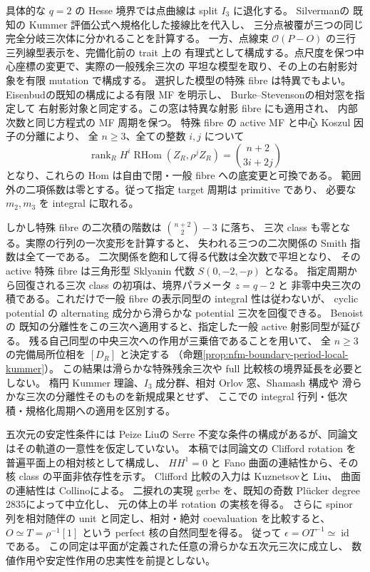 \documentclass[11pt,a4paper]{ltjsarticle}
\numberwithin{equation}{section}
\begin{document}
具体的な $q=2$ の Hesse 境界では点曲線は split $I_3$ に退化する。
Silverman\cite[Chapter~XI, Proposition~9.2]{NFMSilvermanArithmetic}の
既知の Kummer 評価公式へ規格化した接線比を代入し、
三分点被覆が三つの同じ完全分岐三次体に分かれることを計算する。
一方、点線束 $\mathcal O(P-O)$ の三行三列線型表示を、完備化前の trait 上の
有理式として構成する。点尺度を保つ中心座標の変更で、実際の一般残余三次の
平坦な模型を取り、その上の右射影対象を有限 mutation で構成する。
選択した模型の特殊 fibre は特異でもよい。
Eisenbud\cite[Theorem~7.2]{NFMEisenbudCI}の既知の構成による有限 MF を明示し、
Burke--Stevenson\cite[Theorem~6.4(1)]{NFMBurkeStevenson}の相対窓を指定して
右射影対象と同定する。この窓は特異な射影 fibre にも適用され、
内部次数と同じ方程式の MF 周期を保つ。
特殊 fibre の active MF と中心 Koszul 因子の分離により、
全 $n\ge3$、全ての整数 $i,j$ について
\[
 \operatorname{rank}_R H^i\operatorname{RHom}(Z_R,\rho^jZ_R)
 =\binom{n+2}{3i+2j}
\]
となり、これらの Hom は自由で閉・一般 fibre への底変更と可換である。
範囲外の二項係数は零とする。従って指定 target 周期は primitive であり、
必要な $m_2,m_3$ を integral に取れる。

しかし特殊 fibre の二次積の階数は $\binom{n+2}{2}-3$ に落ち、
三次 class も零となる。実際の行列の一次変形を計算すると、
失われる三つの二次関係の Smith 指数は全て一である。
二次関係を飽和して得る代数は全次数で平坦となり、
その active 特殊 fibre は三角形型 Sklyanin 代数 $S(0,-2,-p)$ となる。
指定周期から回復される三次 class の初項は、境界パラメータ $z=q-2$ と
非零中央三次の積である。これだけで一般 fibre の表示同型の integral 性は従わないが、
cyclic potential の alternating 成分から滑らかな potential 三次を回復できる。
Benoist\cite[Theorems~1.6(ii), 1.7, Lemma~2.2(iii)]{NFMBenoistSeparation}の
既知の分離性をこの三次へ適用すると、指定した一般 active 射影同型が延びる。
残る自己同型の中央三次への作用が三乗倍であることを用いて、
全 $n\ge3$ の完備局所位相を $[D_R]$ と決定する
（命題\ref{prop:nfm-boundary-period-local-kummer}）。
この結果は滑らかな特殊残余三次や full 比較核の境界延長を必要としない。
楕円 Kummer 理論、$I_3$ 成分群、相対 Orlov 窓、Shamash 構成や
滑らかな三次の分離性そのものを新規成果とせず、
ここでの integral 行列・低次積・規格化周期への適用を区別する。

五次元の安定性条件には Peize Liu\cite[Theorem~1.1, Remark~5.6]{NFMPeizeLiuFivefold}の
Serre 不変な条件の構成があるが、同論文はその軌道の一意性を仮定していない。
本稿では同論文の Clifford rotation を普遍平面上の相対核として構成し、
$HH^1=0$ と Fano 曲面の連結性から、その核 class の平面非依存性を示す。
Clifford 比較の入力は Kuznetsov\cite[Theorem~4.2]{NFMKuznetsovQuadric}と
Liu\cite[Theorem~2.8, Corollary~3.10]{NFMPeizeLiuFivefold}、
曲面の連結性は Collino\cite[Propositions~1.8, 1.10]{NFMCollinoFivefold}による。
二捩れの実現 gerbe を、既知の奇数 Pl\"ucker degree
$2835$\cite[Example~4.4]{NFMCilibertoZaidenbergFano}によって中立化し、
元の体上の半 rotation の実核を得る。
さらに spinor 列を相対随伴の unit と同定し、相対・絶対 coevaluation を比較すると、
$O\simeq T=\rho^{-1}[1]$ という perfect 核の自然同型を得る。
従って $\epsilon=OT^{-1}\simeq\operatorname{id}$ である。
この同定は平面が定義された任意の滑らかな五次元三次に成立し、
数値作用や安定性作用の忠実性を前提としない。
\end{document}
